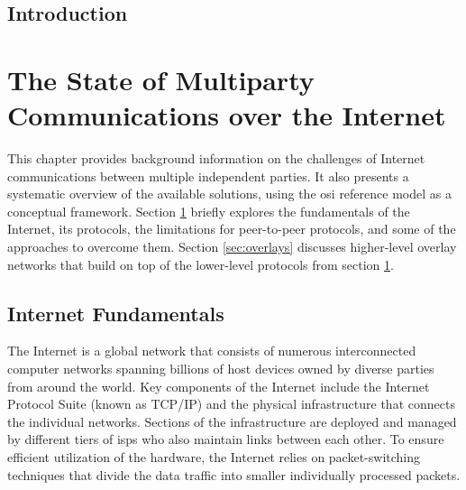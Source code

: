 \tableofcontents

\printnoidxglossary[type=\acronymtype,title=List of Abbreviations]
\listoffigures

\mainmatter

\hypertarget{introduction}{%
\chapter{Introduction}\label{introduction}}

\hypertarget{the-state-of-multiparty-communications-over-the-internet}{%
\part{The State of Multiparty Communications over the
Internet}\label{the-state-of-multiparty-communications-over-the-internet}}


This chapter provides background information on the challenges of
Internet communications between multiple independent parties. It also
presents a systematic overview of the available solutions, using the
\gls{osi} reference model as a conceptual framework. Section
\ref{sec:internet} briefly explores the fundamentals of the Internet,
its protocols, the limitations for peer-to-peer protocols, and some of
the approaches to overcome them. Section \ref{sec:overlays} discusses
higher-level overlay networks that build on top of the lower-level
protocols from section \ref{sec:internet}.

\hypertarget{sec:internet}{%
\chapter{Internet Fundamentals}\label{sec:internet}}


The Internet is a global network that consists of numerous
interconnected computer networks spanning billions of host devices owned
by diverse parties from around the world. Key components of the Internet
include the Internet Protocol Suite (known as TCP/IP) and the physical
infrastructure that connects the individual networks. Sections of the
infrastructure are deployed and managed by different tiers of
\glspl{isp} who also maintain links between each other. To ensure
efficient utilization of the hardware, the Internet relies on
packet-switching techniques that divide the data traffic into smaller
individually processed packets.

